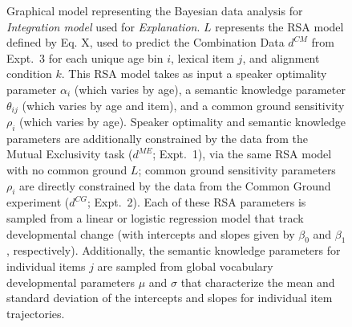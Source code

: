 \documentclass{article}
\begin{document}
\begin{figure}[ht]
\begin{center}
\begin{tabular}{cc}
    \end{tabular}
  \end{center}
  \caption{Graphical model representing the Bayesian data analysis for \emph{Integration model} used for \emph{Explanation}. $L$ represents the RSA model defined by Eq. X, used to predict the Combination Data $d^{CM}$  from Expt.~3 for each unique age bin $i$, lexical item $j$, and alignment condition $k$. This RSA model takes as input a speaker optimality parameter $\alpha_i$ (which varies by age), a semantic knowledge parameter $\theta_{ij}$ (which varies by age and item), and a common ground sensitivity $\rho_i$ (which varies by age). Speaker optimality and semantic knowledge parameters are additionally constrained by the data from the Mutual Exclusivity task ($d^{ME}$; Expt.~1), via the same RSA model with no common ground $L$;  common ground sensitivity parameters $\rho_i$ are directly constrained by the data from the Common Ground experiment ($d^{CG}$; Expt.~2).  
  Each of these RSA parameters is sampled from a linear or logistic regression model that track developmental change (with intercepts and slopes given by $\beta_0$ and $\beta_1$, respectively). Additionally, the semantic knowledge parameters for individual items $j$ are sampled from global vocabulary developmental parameters $\mu$ and $\sigma$ that characterize the mean and standard deviation of the intercepts and slopes for individual item trajectories.}
  \label{fig:bayesnet}
\end{figure}
\end{document}
